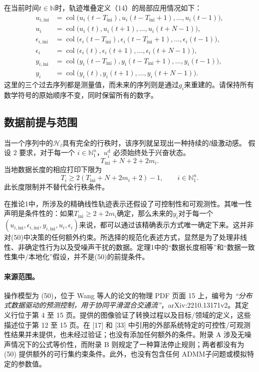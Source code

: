 \documentclass{article}
\begin{document}
在当前时间$t\in\mathbb N$时，轨迹堆叠定义（14）的局部应用情况如下：
\begin{align*}
u_{i,\mathrm{ini}}&=\operatorname{col}\bigl(u_i(t-T_{\mathrm{ini}}),u_i(t-T_{\mathrm{ini}}+1),\ldots,u_i(t-1)\bigr),\\
u_i&=\operatorname{col}\bigl(u_i(t),u_i(t+1),\ldots,u_i(t+N-1)\bigr),\\
\epsilon_{i,\mathrm{ini}}&=\operatorname{col}\bigl(\epsilon_i(t-T_{\mathrm{ini}}),\epsilon_i(t-T_{\mathrm{ini}}+1),\ldots,\epsilon_i(t-1)\bigr),\\
\epsilon_i&=\operatorname{col}\bigl(\epsilon_i(t),\epsilon_i(t+1),\ldots,\epsilon_i(t+N-1)\bigr),\\
y_{i,\mathrm{ini}}&=\operatorname{col}\bigl(y_i(t-T_{\mathrm{ini}}),y_i(t-T_{\mathrm{ini}}+1),\ldots,y_i(t-1)\bigr),\\
y_i&=\operatorname{col}\bigl(y_i(t),y_i(t+1),\ldots,y_i(t+N-1)\bigr).
\end{align*}
这里的三个过去序列都是测量值，而未来的序列则是通过$g_i$来重建的。请保持所有数学符号的原始顺序不变，同时保留所有的数字。

\subsection*{数据前提与范围}
当一个序列中的$\mathcal H_l$具有完全的行秩时，该序列就呈现出一种持续的$l$级激动感。 假设 2 要求，对于每一个 $i\in\mathbb N_1^n$，$u_i^{\mathrm d}$ 必须始终处于兴奋状态。
\[
T_{\mathrm{ini}}+N+2+2m_i.
\]
当地数据长度的相应打印下限为
\begin{equation}
T_i\geq2(T_{\mathrm{ini}}+N+2m_i+2)-1,
\qquad i\in\mathbb N_1^n. \tag{34}
\end{equation}
此长度限制并不替代全行秩条件。

在推论1中，所涉及的精确线性轨迹表示还假设了可控制性和可观测性。其唯一性声明是条件性的：如果$T_{\mathrm{ini}}\geq2+2m_i$确定，那么未来的$y_i$对于每一个$(u_{i,\mathrm{ini}},\epsilon_{i,\mathrm{ini}},y_{i,\mathrm{ini}},u_i,\epsilon_i)$来说，都可以通过该精确表示方式唯一确定下来。这并非对(50)中决策的任何额外约束。所选择的规范化表述方式，显然是为了处理非线性、非确定性行为以及受噪声干扰的数据。定理1中的“数据长度相等”和“数据一致性集中/本地化”假设，并不是(50)的前提条件。

\paragraph{来源范围。}
操作模型为 (50)，位于 Wang 等人的论文的物理 PDF 页面 15 上，编号为 \emph{“分布式数据驱动的预测控制，用于协同平滑混合交通流”}，arXiv:2210.13171v2。其定义行位于第 4 至 15 页。提供的图像验证了转换过程以及目标/领域的定义，这些描述位于第 12 至 15 页。在 [17] 和 [33] 中引用的外部系统特定的可控性/可观测性结果并未提供，也未经过验证；也没有添加任何额外的条件。附录 A 涉及无噪声情况下的公式等价性，而附录 B 则规定了一种算法停止规则；两者都没有为 (50) 提供额外的可行集约束条件。此外，也没有包含任何 ADMM子问题或模拟特定的参数值。
\end{document}
